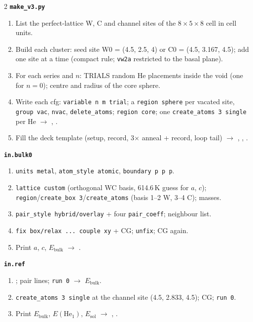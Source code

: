 \documentclass[10pt]{article}
\newcommand{\cmd}[1]{\texttt{\small #1}}
\newcommand{\He}{\mathrm{He}}
\begin{document}
\begin{multicols}{2}
\small
\textbf{\cmd{make\_v3.py}}
\begin{enumerate}
\item List the perfect-lattice W, C and channel sites of the $8\times5\times8$ cell in cell units.
\item Build each cluster: seed site W0 = (4.5, 2.5, 4) or C0 = (4.5, 3.167, 4.5); add one site at a time (compact rule; \cmd{vw2a} restricted to the basal plane).
\item For each series and $n$: TRIALS random He placements inside the void (one for $n=0$); centre and radius of the core sphere.
\item Write each cfg: \cmd{variable n m trial}; a \cmd{region sphere} per vacated site, \cmd{group vac}, \cmd{nvac}, \cmd{delete\_atoms}; \cmd{region core}; one \cmd{create\_atoms 3 single} per He $\rightarrow$ , .
\item Fill the deck template (setup, record, 3$\times$ anneal + record, loop tail) $\rightarrow$ , , .
\end{enumerate}

\textbf{\cmd{in.bulk0}}
\begin{enumerate}
\item \cmd{units metal}, \cmd{atom\_style atomic}, \cmd{boundary p p p}.
\item \cmd{lattice custom} (orthogonal WC basis, 614.6\,K guess for $a$, $c$); \cmd{region}/\cmd{create\_box 3}/\cmd{create\_atoms} (basis 1--2 W, 3--4 C); masses.
\item \cmd{pair\_style hybrid/overlay} + four \cmd{pair\_coeff}; neighbour list.
\item \cmd{fix box/relax ... couple xy} + CG; \cmd{unfix}; CG again.
\item Print $a$, $c$, $E_\mathrm{bulk}$ $\rightarrow$ .
\end{enumerate}

\textbf{\cmd{in.ref}}
\begin{enumerate}
\item {}; pair lines; \cmd{run 0} $\rightarrow$ $E_\mathrm{bulk}$.
\item \cmd{create\_atoms 3 single} at the channel site (4.5, 2.833, 4.5); CG; \cmd{run 0}.
\item Print $E_\mathrm{bulk}$, $E(\He_1)$, $E_\mathrm{sol}$ $\rightarrow$ , .
\end{enumerate}


\end{multicols}
\end{document}
